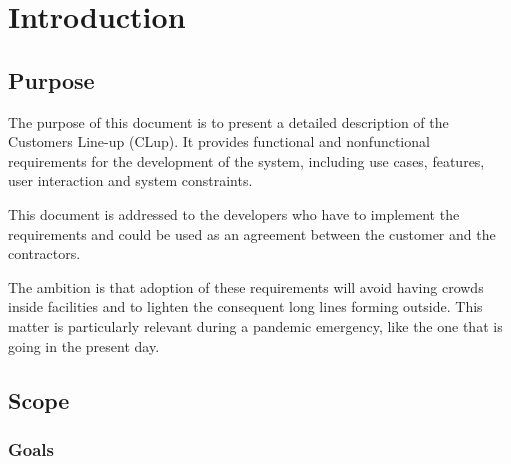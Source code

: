 \chapter{Introduction}

\section{Purpose}
The purpose of this document is to present a detailed description of the Customers Line-up (CLup).
It provides functional and nonfunctional requirements for the development of the system, including use cases, features, user interaction and system constraints.

This document is addressed to the developers who have to implement the requirements and could be used as an agreement between the customer and the contractors.

The ambition is that adoption of these requirements will avoid having crowds inside facilities and to lighten the consequent long lines forming outside. This matter is particularly relevant during a pandemic emergency, like the one that is going in the present day.

\section{Scope}

\subsection{Goals}
